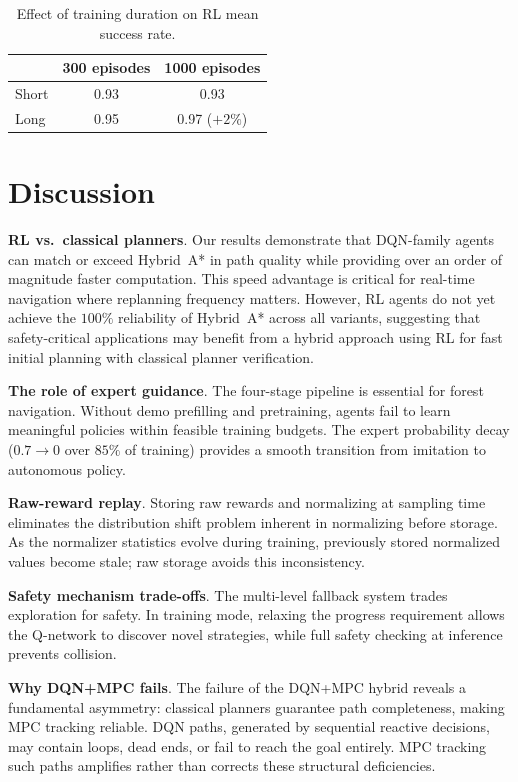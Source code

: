 \documentclass[conference]{IEEEtran}
\begin{document}
\begin{table}[t]
\centering
\caption{Effect of training duration on RL mean success rate.}
\label{tab:ablation_episodes}
\footnotesize
\begin{tabular}{@{}lcc@{}}
\toprule
& \textbf{300 episodes} & \textbf{1000 episodes} \\
\midrule
Short & 0.93 & 0.93 \\
Long  & 0.95 & 0.97 ($+2\%$) \\
\bottomrule
\end{tabular}
\end{table}

\section{Discussion}\label{sec:discussion}

\textbf{RL vs.\ classical planners}.
Our results demonstrate that DQN-family agents can match or exceed Hybrid~A* in path quality while providing over an order of magnitude faster computation.
This speed advantage is critical for real-time navigation where replanning frequency matters.
However, RL agents do not yet achieve the $100\%$ reliability of Hybrid~A* across all variants, suggesting that safety-critical applications may benefit from a hybrid approach using RL for fast initial planning with classical planner verification.

\textbf{The role of expert guidance}.
The four-stage pipeline is essential for forest navigation.
Without demo prefilling and pretraining, agents fail to learn meaningful policies within feasible training budgets.
The expert probability decay ($0.7 \to 0$ over $85\%$ of training) provides a smooth transition from imitation to autonomous policy.

\textbf{Raw-reward replay}.
Storing raw rewards and normalizing at sampling time eliminates the distribution shift problem inherent in normalizing before storage.
As the normalizer statistics evolve during training, previously stored normalized values become stale; raw storage avoids this inconsistency.

\textbf{Safety mechanism trade-offs}.
The multi-level fallback system trades exploration for safety.
In training mode, relaxing the progress requirement allows the Q-network to discover novel strategies, while full safety checking at inference prevents collision.

\textbf{Why DQN+MPC fails}.
The failure of the DQN+MPC hybrid reveals a fundamental asymmetry: classical planners guarantee path completeness, making MPC tracking reliable.
DQN paths, generated by sequential reactive decisions, may contain loops, dead ends, or fail to reach the goal entirely.
MPC tracking such paths amplifies rather than corrects these structural deficiencies.
\end{document}
